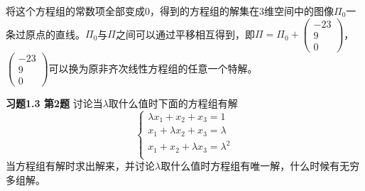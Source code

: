 将这个方程组的常数项全部变成0，得到的方程组的解集在3维空间中的图像$\Pi_0$一条过原点的直线。$\Pi_0$与$\Pi$之间可以通过平移相互得到，即$\Pi = \Pi_0 + \begin{pmatrix} -23 \\ 9 \\ 0 \end{pmatrix}$，$\begin{pmatrix} -23 \\ 9 \\ 0 \end{pmatrix}$可以换为原非齐次线性方程组的任意一个特解。

\newpageorvspace

{\bf 习题1.3 第2题} 讨论当$\lambda$取什么值时下面的方程组有解
$$\begin{cases}
\lambda x_1 + x_2 + x_3 = 1 \\
x_1 + \lambda x_2 + x_3 = \lambda \\
x_1 + x_2 + \lambda x_3 = \lambda^2 \\
\end{cases}$$
当方程组有解时求出解来，并讨论$\lambda$取什么值时方程组有唯一解，什么时候有无穷多组解。

\newpageorvspace

